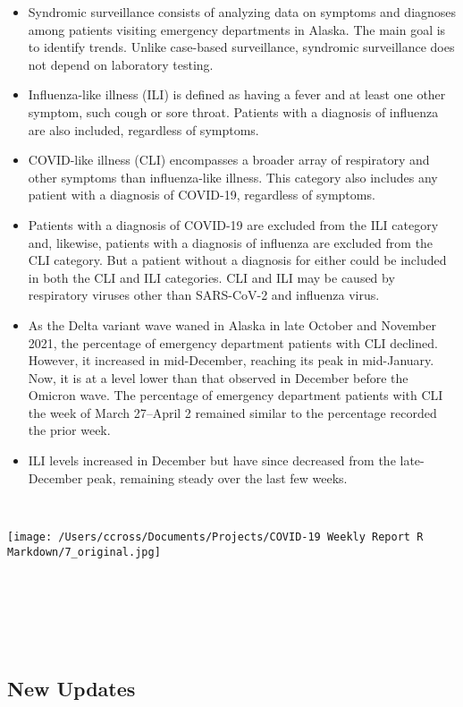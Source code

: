 \documentclass[
]{article}
\begin{document}
\begin{itemize}
\item
  Syndromic surveillance consists of analyzing data on symptoms and
  diagnoses among patients visiting emergency departments in Alaska. The
  main goal is to identify trends. Unlike case-based surveillance,
  syndromic surveillance does not depend on laboratory testing.
\item
  Influenza-like illness (ILI) is defined as having a fever and at least
  one other symptom, such cough or sore throat. Patients with a
  diagnosis of influenza are also included, regardless of symptoms.
\item
  COVID-like illness (CLI) encompasses a broader array of respiratory
  and other symptoms than influenza-like illness. This category also
  includes any patient with a diagnosis of COVID-19, regardless of
  symptoms.
\item
  Patients with a diagnosis of COVID-19 are excluded from the ILI
  category and, likewise, patients with a diagnosis of influenza are
  excluded from the CLI category. But a patient without a diagnosis for
  either could be included in both the CLI and ILI categories. CLI and
  ILI may be caused by respiratory viruses other than SARS-CoV-2 and
  influenza virus.
\item
  As the Delta variant wave waned in Alaska in late October and November
  2021, the percentage of emergency department patients with CLI
  declined. However, it increased in mid-December, reaching its peak in
  mid-January. Now, it is at a level lower than that observed in
  December before the Omicron wave. The percentage of emergency
  department patients with CLI the week of March 27--April 2 remained
  similar to the percentage recorded the prior week.
\item
  ILI levels increased in December but have since decreased from the
  late-December peak, remaining steady over the last few weeks.
\end{itemize}

~

\texttt{[image: /Users/ccross/Documents/Projects/COVID-19 Weekly Report R Markdown/7\_original.jpg]}

~

~

~

\hypertarget{new-updates}{%
\subsection{New Updates}\label{new-updates}}
\end{document}
